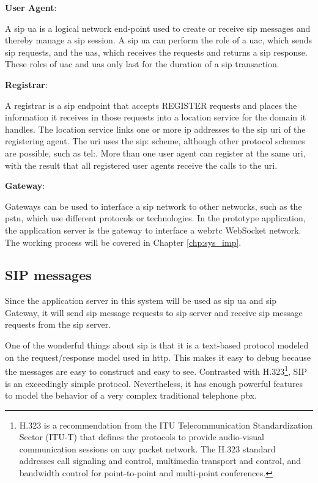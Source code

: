 \noindent \textbf{User Agent}\cite{wiki:sip}:
\par A \gls{sip} \gls{ua} is a logical network end-point used to create or receive \gls{sip} messages and thereby manage a \gls{sip} session. A \gls{sip} \gls{ua} can perform the role of a \gls{uac}, which sends \gls{sip} requests, and the \gls{uas}, which receives the requests and returns a \gls{sip} response. These roles of \gls{uac} and \gls{uas} only last for the duration of a \gls{sip} transaction.

\noindent \textbf{Registrar}\cite{wiki:sip}:
\par A registrar is a \gls{sip} endpoint that accepts REGISTER requests and places the information it receives in those requests into a location service for the domain it handles. The location service links one or more \gls{ip} addresses to the \gls{sip} \gls{uri} of the registering agent. The \gls{uri} uses the sip: scheme, although other protocol schemes are possible, such as tel:. More than one user agent can register at the same \gls{uri}, with the result that all registered user agents receive the calls to the \gls{uri}.

\noindent \textbf{Gateway}\cite{wiki:sip}:
\par Gateways can be used to interface a \gls{sip} network to other networks, such as the \gls{pstn}, which use different protocols or technologies. In the prototype application, the application server is the gateway to interface a \gls{webrtc} WebSocket network. The working process will be covered in Chapter \ref{chp:sys_imp}.

\subsection{SIP messages}
\noindent Since the application server in this system will be used as \gls{sip} \gls{ua} and \gls{sip} Gateway, it will send \gls{sip} message requests to \gls{sip} server and receive \gls{sip} message requests from the \gls{sip} server.

\par One of the wonderful things about \gls{sip} is that it is a text-based protocol modeled on the request/response model used in \gls{http}. This makes it easy to debug because the messages are easy to construct and easy to see.  Contrasted with H.323\footnote{H.323 is a recommendation from the ITU Telecommunication Standardization Sector (ITU-T) that defines the protocols to provide audio-visual communication sessions on any packet network. The H.323 standard addresses call signaling and control, multimedia transport and control, and bandwidth control for point-to-point and multi-point conferences.\cite{wiki:h323}}, SIP is an exceedingly simple protocol.  Nevertheless, it has enough powerful features to model the behavior of a very complex traditional telephone \gls{pbx}.\cite{networkworld:sip}

